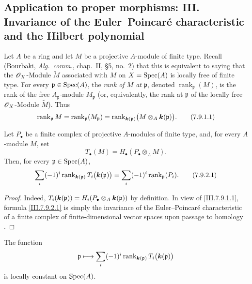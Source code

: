 \subsection{Application to proper morphisms: III. Invariance of the
Euler--Poincar\'e characteristic and the Hilbert polynomial}
\label{subsection:III.7.9}
\label{III.7.9}

\begin{env}[7.9.1]
\label{III.7.9.1}
Let $A$ be a ring and let $M$ be a projective $A$-module of
finite type.  Recall (Bourbaki, \emph{Alg.~comm.}, chap.~II,
\S5, no.~2) that this is equivalent to saying that the
$\mathscr{O}_X$-Module $\widetilde M$ associated with $M$ on
$X=\operatorname{Spec}(A)$ is locally free of finite type.  For every
$\mathfrak p\in\operatorname{Spec}(A)$, the \emph{rank of $M$ at
$\mathfrak p$}, denoted $\operatorname{rank}_{\mathfrak p}(M)$,
is the rank of the free $A_{\mathfrak p}$-module
$M_{\mathfrak p}$ (or, equivalently, the rank at
$\mathfrak p$ of the locally free $\mathscr{O}_X$-Module
$\widetilde M$).  Thus
\[
  \operatorname{rank}_{\mathfrak p}M
  =
  \operatorname{rank}_{\mathfrak p}(M_{\mathfrak p})
  =
  \operatorname{rank}_{\boldsymbol{k}(\mathfrak p)}
    \bigl(M\otimes_A\boldsymbol{k}(\mathfrak p)\bigr).
  \tag{7.9.1.1}\label{III.7.9.1.1}
\]
\end{env}

\begin{proposition}[7.9.2]
\label{III.7.9.2}
Let $P_\bullet$ be a finite complex of projective $A$-modules
of finite type, and, for every $A$-module $M$, set
\[
  T_\bullet(M)=H_\bullet(P_\bullet\otimes_A M).
\]
Then, for every $\mathfrak p\in\operatorname{Spec}(A)$,
\[
  \sum_i(-1)^i
    \operatorname{rank}_{\boldsymbol{k}(\mathfrak p)}
      T_i\bigl(\boldsymbol{k}(\mathfrak p)\bigr)
  =
  \sum_i(-1)^i\operatorname{rank}_{\mathfrak p}(P_i).
  \tag{7.9.2.1}\label{III.7.9.2.1}
\]
\end{proposition}

\begin{proof}
Indeed,
$T_i(\boldsymbol{k}(\mathfrak p))
 =H_i(P_\bullet\otimes_A\boldsymbol{k}(\mathfrak p))$ by definition.
In view of \eqref{III.7.9.1.1}, formula
\eqref{III.7.9.2.1} is simply the invariance of the
Euler--Poincar\'e characteristic of a finite complex of
finite-dimensional vector spaces upon passage to homology
.
\end{proof}

\begin{corollary}[7.9.3]
\label{III.7.9.3}
The function
\[
  \mathfrak p\longmapsto
  \sum_i(-1)^i
    \operatorname{rank}_{\boldsymbol{k}(\mathfrak p)}
      T_i\bigl(\boldsymbol{k}(\mathfrak p)\bigr)
\]
is locally constant on $\operatorname{Spec}(A)$.
\end{corollary}

